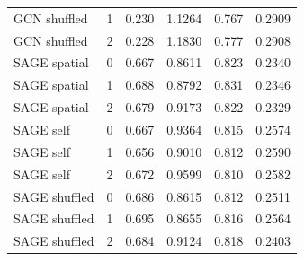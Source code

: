 \begin{table}[!htbp]
\begin{tabular}{@{}lrrrrr@{}}
GCN shuffled & 1 & 0.230 & 1.1264 & 0.767 & 0.2909 \\
GCN shuffled & 2 & 0.228 & 1.1830 & 0.777 & 0.2908 \\
SAGE spatial & 0 & 0.667 & 0.8611 & 0.823 & 0.2340 \\
SAGE spatial & 1 & 0.688 & 0.8792 & 0.831 & 0.2346 \\
SAGE spatial & 2 & 0.679 & 0.9173 & 0.822 & 0.2329 \\
SAGE self & 0 & 0.667 & 0.9364 & 0.815 & 0.2574 \\
SAGE self & 1 & 0.656 & 0.9010 & 0.812 & 0.2590 \\
SAGE self & 2 & 0.672 & 0.9599 & 0.810 & 0.2582 \\
SAGE shuffled & 0 & 0.686 & 0.8615 & 0.812 & 0.2511 \\
SAGE shuffled & 1 & 0.695 & 0.8655 & 0.816 & 0.2564 \\
SAGE shuffled & 2 & 0.684 & 0.9124 & 0.818 & 0.2403 \\
\bottomrule
\end{tabular}
\end{table}
\FloatBarrier
